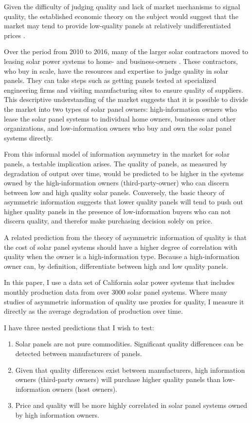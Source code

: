 \documentclass[a4paper]{article}
\begin{document}
Given the difficulty of judging quality and lack of market mechanisms to signal quality, the established economic theory on the subject would suggest that the market may tend to provide low-quality panels at relatively undifferentiated prices \citep{tirole_theory_1988}.

Over the period from 2010 to 2016, many of the larger solar contractors moved to leasing solar power systems to home- and business-owners \citep{mauritzen_cost_2017}. These contractors, who buy in scale, have the resources and expertise to judge quality in solar panels. They can take steps such as getting panels tested at specialized engineering firms and visiting manufacturing sites to ensure quality of suppliers. This descriptive understanding of the market suggests that it is possible to divide the market into two types of solar panel owners: high-information owners who lease the solar panel systems to individual home owners, businesses and other organizations, and low-information owners who buy and own the solar panel systems directly.

From this informal model of information asymmetry in the market for solar panels, a testable implication arises. The quality of panels, as measured by degradation of output over time, would be predicted to be higher in the systems owned by the high-information owners (third-party-owner) who can discern between low and high quality solar panels. Conversely, the basic theory of asymmetric information suggests that lower quality panels will tend to push out higher quality panels in the presence of low-information buyers who can not discern quality, and therefor make purchasing decision solely on price.

A related prediction from the theory of asymmetric information of quality is that the cost of solar panel systems should have a higher degree of correlation with quality when the owner is a high-information type. Because a high-information owner can, by definition, differentiate between high and low quality panels.

In this paper, I use a data set of California solar power systems that includes monthly production data from over 3000 solar panel systems. Where many studies of asymmetric information of quality use proxies for quality, I measure it directly as the average degradation of production over time.

I have three nested predictions that I wish to test:

\begin{enumerate}
  \item Solar panels are not pure commodities. Significant quality differences can be detected between manufacturers of panels.
  \item Given that quality differences exist between manufacturers, high information owners (third-party owners) will purchase higher quality panels than low-information owners (host owners).
  \item Price and quality will be more highly correlated in solar panel systems owned by high information owners.
\end{enumerate}
\end{document}
